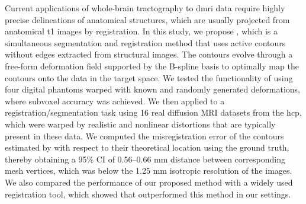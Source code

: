 Current applications of whole-brain tractography to \acrlong*{dmri} data require highly precise
  delineations of anatomical structures, which are usually projected from anatomical \acrlong*{t1} images
  by registration.
In this study, we propose \regseg{}, which is a simultaneous segmentation and registration method
  that uses active contours without edges extracted from structural images.
The contours evolve through a free-form deformation field supported by the B-spline basis
  to optimally map the contours onto the data in the target space.
We tested the functionality of \regseg{} using four digital phantoms warped with known and
  randomly generated deformations, where subvoxel accuracy was achieved.
We then applied \regseg{} to a registration/segmentation task using 16 real diffusion MRI
  datasets from the \acrlong*{hcp}, which were warped by realistic and nonlinear distortions that are typically
  present in these data.
We computed the misregistration error of the contours estimated by \regseg{} with respect
  to their theoretical location using the ground truth, thereby obtaining a 95\% CI of 0.56--0.66 mm
  distance between corresponding mesh vertices, which was below the 1.25 mm isotropic resolution of the images.
We also compared the performance of our proposed method with a widely used registration tool, which showed 
  that \regseg{} outperformed this method in our settings.